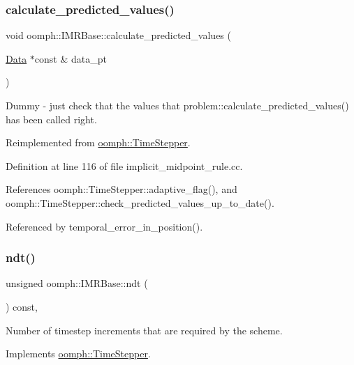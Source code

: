 \subsubsection{\texorpdfstring{calculate\+\_\+predicted\+\_\+values()}{calculate\_predicted\_values()}}
{\footnotesize\ttfamily void oomph\+::\+I\+M\+R\+Base\+::calculate\+\_\+predicted\+\_\+values (\begin{DoxyParamCaption}\item[{\hyperlink{classoomph_1_1Data}{Data} $\ast$const \&}]{data\+\_\+pt }\end{DoxyParamCaption})\hspace{0.3cm}{\ttfamily [virtual]}}

Dummy -\/ just check that the values that problem\+::calculate\+\_\+predicted\+\_\+values() has been called right. 

Reimplemented from \hyperlink{classoomph_1_1TimeStepper_a159d508b1ae643fe31b55da9ee789dbf}{oomph\+::\+Time\+Stepper}.



Definition at line 116 of file implicit\+\_\+midpoint\+\_\+rule.\+cc.



References oomph\+::\+Time\+Stepper\+::adaptive\+\_\+flag(), and oomph\+::\+Time\+Stepper\+::check\+\_\+predicted\+\_\+values\+\_\+up\+\_\+to\+\_\+date().



Referenced by temporal\+\_\+error\+\_\+in\+\_\+position().

\mbox{\label{classoomph_1_1IMRBase_a7d7c5c2dedead518b9b0882e74914f54}} 
\subsubsection{\texorpdfstring{ndt()}{ndt()}}
{\footnotesize\ttfamily unsigned oomph\+::\+I\+M\+R\+Base\+::ndt (\begin{DoxyParamCaption}{ }\end{DoxyParamCaption}) const\hspace{0.3cm}{\ttfamily [inline]}, {\ttfamily [virtual]}}



Number of timestep increments that are required by the scheme. 



Implements \hyperlink{classoomph_1_1TimeStepper_a00e57b6436cff4fc82af481b81a78a1a}{oomph\+::\+Time\+Stepper}.



